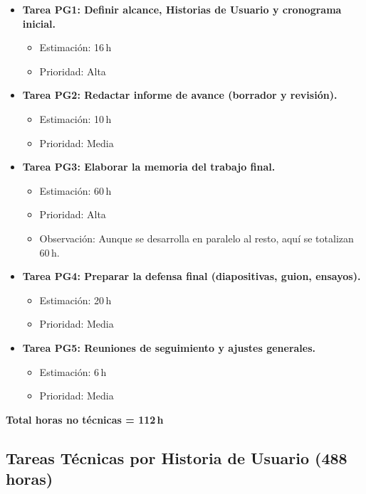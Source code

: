 \documentclass[
11pt, %
]{ProyectoVpC}
\begin{document}
\begin{itemize}
  \item \textbf{Tarea PG1: Definir alcance, Historias de Usuario y cronograma inicial.}
    \begin{itemize}
      \item Estimación: 16\,h
      \item Prioridad: Alta
    \end{itemize}

  \item \textbf{Tarea PG2: Redactar informe de avance (borrador y revisión).}
    \begin{itemize}
      \item Estimación: 10\,h
      \item Prioridad: Media
    \end{itemize}

  \item \textbf{Tarea PG3: Elaborar la memoria del trabajo final.}
    \begin{itemize}
      \item Estimación: 60\,h
      \item Prioridad: Alta
      \item Observación: Aunque se desarrolla en paralelo al resto, aquí se totalizan 60\,h.
    \end{itemize}

  \item \textbf{Tarea PG4: Preparar la defensa final (diapositivas, guion, ensayos).}
    \begin{itemize}
      \item Estimación: 20\,h
      \item Prioridad: Media
    \end{itemize}

  \item \textbf{Tarea PG5: Reuniones de seguimiento y ajustes generales.}
    \begin{itemize}
      \item Estimación: 6\,h
      \item Prioridad: Media
    \end{itemize}
\end{itemize}

\vspace{0.8em}
\noindent \textbf{Total horas no técnicas = 112\,h}
\vspace{1em}

\subsection{Tareas Técnicas por Historia de Usuario (488 horas)}
\end{document}
